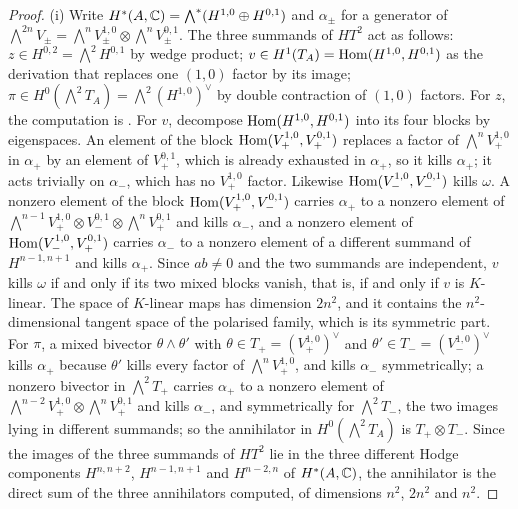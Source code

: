 \begin{proof}
(i) Write $H^{*}(A,\mathbb{C})=\bigwedge^{*}(H^{1,0}\oplus H^{0,1})$ and
$\alpha_{\pm}$ for a generator of $\bigwedge^{2n}V_{\pm}
=\bigwedge^{n}V_{\pm}^{1,0}\otimes\bigwedge^{n}V_{\pm}^{0,1}$. The three
summands of $HT^{2}$ act as follows: $z\in H^{0,2}=\bigwedge^{2}H^{0,1}$ by
wedge product; $v\in H^{1}(T_{A})=\operatorname{Hom}(H^{1,0},H^{0,1})$ as the derivation
that replaces one $(1,0)$ factor by its image; $\pi\in H^{0}(\bigwedge^{2}T_{A})
=\bigwedge^{2}(H^{1,0})^{\vee}$ by double contraction of $(1,0)$ factors. For
$z$, the computation is \cite[Lemma~9.6]{paperI}. For $v$, decompose
$\operatorname{Hom}(H^{1,0},H^{0,1})$ into its four blocks by eigenspaces. An element of
the block $\operatorname{Hom}(V_{+}^{1,0},V_{+}^{0,1})$ replaces a factor of
$\bigwedge^{n}V_{+}^{1,0}$ in $\alpha_{+}$ by an element of $V_{+}^{0,1}$,
which is already exhausted in $\alpha_{+}$, so it kills $\alpha_{+}$; it acts
trivially on $\alpha_{-}$,
which has no $V_{+}^{1,0}$ factor. Likewise $\operatorname{Hom}(V_{-}^{1,0},V_{-}^{0,1})$
kills $\omega$. A nonzero element of the block $\operatorname{Hom}(V_{+}^{1,0},V_{-}^{0,1})$
carries $\alpha_{+}$ to a nonzero element of
$\bigwedge^{n-1}V_{+}^{1,0}\otimes V_{-}^{0,1}\otimes\bigwedge^{n}V_{+}^{0,1}$
and kills $\alpha_{-}$, and a nonzero element of $\operatorname{Hom}(V_{-}^{1,0},V_{+}^{0,1})$
carries $\alpha_{-}$ to a nonzero element of a different summand of
$H^{n-1,n+1}$ and kills $\alpha_{+}$. Since $ab\ne0$ and the two summands are
independent, $v$ kills $\omega$ if and only if its two mixed blocks vanish,
that is, if and only if $v$ is $K$-linear. The space of $K$-linear maps has
dimension $2n^{2}$, and it contains the $n^{2}$-dimensional tangent space of
the polarised family, which is its symmetric part. For $\pi$, a mixed
bivector $\theta\wedge\theta'$ with $\theta\in T_{+}=(V_{+}^{1,0})^{\vee}$ and
$\theta'\in T_{-}=(V_{-}^{1,0})^{\vee}$ kills $\alpha_{+}$ because $\theta'$
kills every factor of $\bigwedge^{n}V_{+}^{1,0}$, and kills $\alpha_{-}$
symmetrically; a nonzero bivector in $\bigwedge^{2}T_{+}$ carries $\alpha_{+}$
to a nonzero element of $\bigwedge^{n-2}V_{+}^{1,0}\otimes\bigwedge^{n}V_{+}^{0,1}$
and kills $\alpha_{-}$, and symmetrically for $\bigwedge^{2}T_{-}$, the two
images lying in different summands; so the annihilator in
$H^{0}(\bigwedge^{2}T_{A})$ is $T_{+}\otimes T_{-}$. Since the images of the
three summands of $HT^{2}$ lie in the three different Hodge components
$H^{n,n+2}$, $H^{n-1,n+1}$ and $H^{n-2,n}$ of $H^{*}(A,\mathbb{C})$, the annihilator
is the direct sum of the three annihilators computed, of dimensions $n^{2}$,
$2n^{2}$ and $n^{2}$.


\end{proof}
